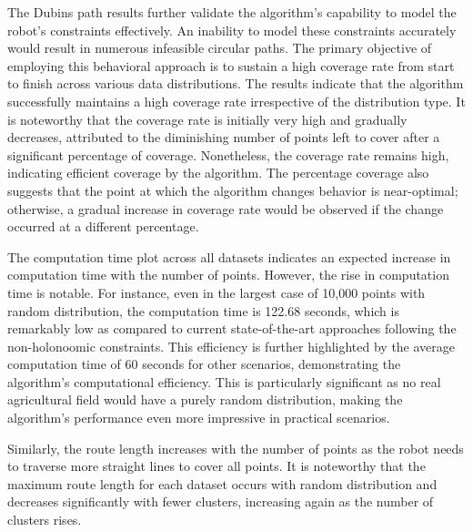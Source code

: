 \vspace*{6mm} 

The Dubins path results further validate the algorithm's capability to model the robot's constraints effectively. An inability to model these constraints accurately would result in numerous infeasible circular paths. The primary objective of employing this behavioral approach is to sustain a high coverage rate from start to finish across various data distributions. The results indicate that the algorithm successfully maintains a high coverage rate irrespective of the distribution type. It is noteworthy that the coverage rate is initially very high and gradually decreases, attributed to the diminishing number of points left to cover after a significant percentage of coverage. Nonetheless, the coverage rate remains high, indicating efficient coverage by the algorithm. The percentage coverage also suggests that the point at which the algorithm changes behavior is near-optimal; otherwise, a gradual increase in coverage rate would be observed if the change occurred at a different percentage.

\vspace*{6mm} 

The computation time plot across all datasets indicates an expected increase in computation time with the number of points. However, the rise in computation time is notable. For instance, even in the largest case of 10,000 points with random distribution, the computation time is 122.68 seconds, which is remarkably low as compared to current state-of-the-art approaches following the non-holonoomic constraints. This efficiency is further highlighted by the average computation time of 60 seconds for other scenarios, demonstrating the algorithm's computational efficiency. This is particularly significant as no real agricultural field would have a purely random distribution, making the algorithm's performance even more impressive in practical scenarios.

\vspace*{6mm} 

Similarly, the route length increases with the number of points as the robot needs to traverse more straight lines to cover all points. It is noteworthy that the maximum route length for each dataset occurs with random distribution and decreases significantly with fewer clusters, increasing again as the number of clusters rises.

\vspace*{6mm} 


